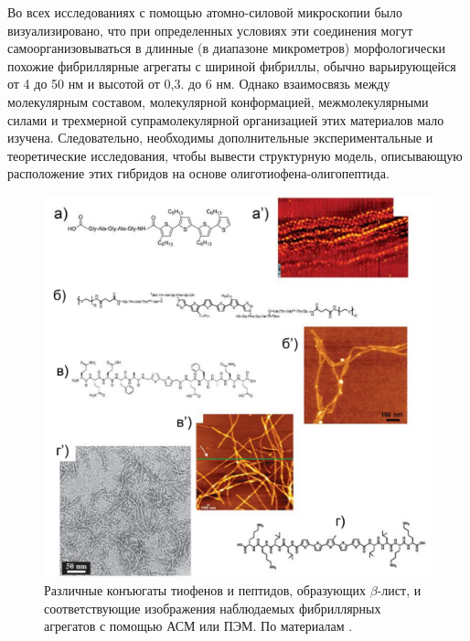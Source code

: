     Во всех исследованиях с помощью атомно-силовой микроскопии было визуализировано, что при определенных условиях эти соединения могут самоорганизовываться в длинные (в диапазоне микрометров) морфологически похожие фибриллярные агрегаты с шириной фибриллы, обычно варьирующейся от 4 до 50 нм и высотой от 0,3. до 6 нм. Однако взаимосвязь между молекулярным составом, молекулярной конформацией, межмолекулярными силами и трехмерной супрамолекулярной организацией этих материалов мало изучена. Следовательно, необходимы дополнительные экспериментальные и теоретические исследования, чтобы вывести структурную модель, описывающую расположение этих гибридов на основе олиготиофена-олигопептида.

\begin{figure} [H]
    \centering
    \includegraphics[width=\textwidth]{images/p4/punkt1/part4_p1_f7.pdf}
    \caption[Различные конъюгаты тиофенов и пептидов, образующих $\beta$-лист]{Различные конъюгаты тиофенов и пептидов, образующих $\beta$-лист, и соответствующие изображения наблюдаемых фибриллярных агрегатов с помощью АСМ или ПЭМ. По материалам  \cite{diegelmann_one-dimensional_2008,klok_synthesis_2004,schillinger_oligothiophene_2009,stone_self-assembling_2009}.}
    \label{fig:p4_p1_f7}
\end{figure}



